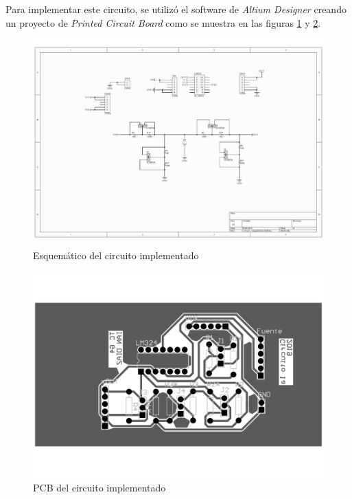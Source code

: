 Para implementar este circuito, se utilizó el software de \emph{Altium
Designer} creando un proyecto de \emph{Printed Circuit Board} como
se muestra en las figuras \ref{1_a_sche} y \ref{1_a_pcb}.

\begin{figure}[H]
\begin{centering}
\includegraphics[scale=0.5]{../Ex1/iA/Resources1a/Schematic}
\par\end{centering}
\caption{Esquemático del circuito implementado}
\label{1_a_sche}

\end{figure}

\begin{figure}[H]
\begin{centering}
\includegraphics[scale=0.3]{../Ex1/iA/Resources1a/PCB}
\par\end{centering}
\caption{PCB del circuito implementado}
\label{1_a_pcb}

\end{figure}

